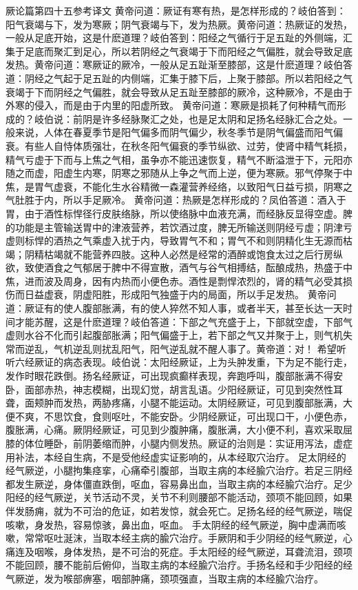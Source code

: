 \documentclass[a4paper,12pt,UTF8,twoside]{ctexbook}
\begin{document}
厥论篇第四十五参考译文
黄帝问道：厥证有寒有热，是怎样形成的？岐伯答到：阳气衰竭与下，发为寒厥；阴气衰竭与下，发为热厥。黄帝问道：热厥证的发热，一般从足底开始，这是什麽道理？岐伯答到：阳经之气循行于足五趾的外侧端，汇集于足底而聚汇到足心，所以若阴经之气衰竭于下而阳经之气偏胜，就会导致足底发热。黄帝问道：寒厥证的厥冷，一般从足五趾渐至膝部，这是什麽道理？岐伯答道：阴经之气起于足五趾的内侧端，汇集于膝下后，上聚于膝部。所以若阳经之气衰竭于下而阴经之气偏胜，就会导致从足五趾至膝部的厥冷，这种厥冷，不是由于外寒的侵入，而是由于内里的阳虚所致。
黄帝问道：寒厥是损耗了何种精气而形成的？岐伯说：前阴是许多经脉聚汇之处，也是足太阴和足扬名经脉汇合之处。一般来说，人体在春夏季节是阳气偏多而阴气偏少，秋冬季节是阴气偏盛而阳气偏衰。有些人自恃体质强壮，在秋冬阳气偏衰的季节纵欲、过劳，使肾中精气耗损，精气亏虚于下而与上焦之气相，虽争亦不能迅速恢复，精气不断溢泄于下，元阳亦随之而虚，阳虚生内寒，阴寒之邪随从上争之气而上逆，便为寒厥。邪气停聚于中焦，是胃气虚衰，不能化生水谷精微一森灌营养经络，以致阳气日益亏损，阴寒之气肚胜于内，所以手足厥冷。
黄帝问道：热厥是怎样形成的？凤伯答道：酒入于胃，由于酒性标悍径行皮肤络脉，所以使络脉中血液充满，而经脉反显得空虚。脾的功能是主管输送胃中的津液营养，若饮酒过度，脾无所输送则阴经亏虚；阴津亏虚则标悍的酒热之气乘虚入扰于内，导致胃气不和；胃气不和则阴精化生无源而枯竭；阴精枯竭就不能营养四肢。这种人必然是经常的酒醉或饱食太过之后行房纵欲，致使酒食之气郁居于脾中不得宣散，酒气与谷气相搏结，酝酿成热，热盛于中焦，进而波及周身，因有内热而小便色赤。酒性是剽悍浓烈的，肾的精气必受其损伤而日益虚衰，阴虚阳胜，形成阳气独盛于内的局面，所以手足发热。
黄帝问道：厥证有的使人腹部胀满，有的使人猝然不知人事，或者半天，甚至长达一天时间才能苏醒，这是什麽道理？岐伯答道：下部之气充盛于上，下部就空虚，下部气虚则水谷不化而引起腹部胀满；阳气偏盛于上，若下部之气又并聚于上，则气机失常而逆乱，气机逆乱则扰乱阳气，阳气逆乱就不醒人事了。黄帝道：对！
希望听听六经厥证的病态表现。岐伯说：太阳经厥证，上为头肿发重，下为足不能行走，发作时眼花跌倒。扬名经厥证，可出现疯癫样表现，奔跑呼叫，腹部胀满不得安卧，面部赤热，神志模糊，出现幻觉，胡言乱语。少阳经厥证，可见到突然性耳聋，面颊肿而发热，两胁疼痛，小腿不能运动。太阴经厥证，可见到腹部胀满，大便不爽，不思饮食，食则呕吐，不能安卧。少阴经厥证，可出现口干，小便色赤，腹胀满，心痛。厥阴经厥证，可见到少腹肿痛，腹胀满，大小便不利，喜欢采取屈膝的体位睡卧，前阴萎缩而肿，小腿内侧发热。厥证的治则是：实证用泻法，虚症用补法，本经自生病，不是受他经虚实证影响的，从本经取穴治疗。
足太阴经的经气厥逆，小腿拘集痉挛，心痛牵引腹部，当取主病的本经腧穴治疗。若足三阴经都发生厥逆，身体僵直跌倒，呕血，容易鼻出血，当取主病的本经腧穴治疗。足少阳经的经气厥逆，关节活动不灵，关节不利则腰部不能活动，颈项不能回顾，如果伴发肠痈，就为不可治的危证，如若发惊，就会死亡。足扬名经的经气厥逆，喘促咳嗽，身发热，容易惊骇，鼻出血，呕血。
手太阴经的经气厥逆，胸中虚满而咳嗽，常常呕吐涎沫，当取本经主病的腧穴治疗。手厥阴和手少阴经的经气厥逆，心痛连及咽喉，身体发热，是不可治的死症。手太阳经的经气厥逆，耳聋流泪，颈项不能回顾，腰不能前后俯仰，当取主病的本经腧穴治疗。手扬名经和手少阳经的经气厥逆，发为喉部痹塞，咽部肿痛，颈项强直，当取主病的本经腧穴治疗。
\end{document}
